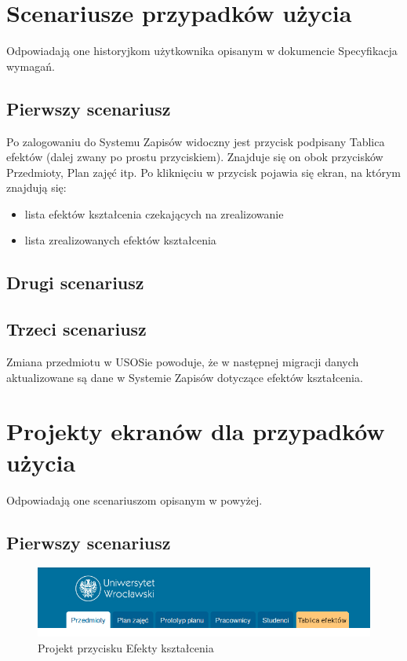\documentclass{article}
\begin{document}
\section{Scenariusze przypadków użycia} %
Odpowiadają one historyjkom użytkownika opisanym w dokumencie Specyfikacja wymagań.

\subsection{Pierwszy scenariusz}
Po zalogowaniu do Systemu Zapisów widoczny jest przycisk podpisany Tablica efektów (dalej zwany po prostu przyciskiem). Znajduje się on obok przycisków Przedmioty, Plan zajęć itp. Po kliknięciu w przycisk pojawia się ekran, na którym znajdują się:
\begin{itemize}
	\item lista efektów kształcenia czekających na zrealizowanie
	\item lista zrealizowanych efektów kształcenia
\end{itemize}

\subsection{Drugi scenariusz}

\subsection{Trzeci scenariusz}
Zmiana przedmiotu w USOSie powoduje, że w następnej migracji danych aktualizowane są dane w Systemie Zapisów dotyczące efektów kształcenia.


\afterpage{\null\newpage}
\newpage

\section{Projekty ekranów dla przypadków użycia}
Odpowiadają one scenariuszom opisanym w powyżej.

\subsection{Pierwszy scenariusz}
\begin{figure}[H]
	\begin{center}
		\caption{Projekt przycisku Efekty kształcenia}
		\includegraphics[scale=0.5]{te.png}
	\end{center}
\end{figure}
\end{document}
